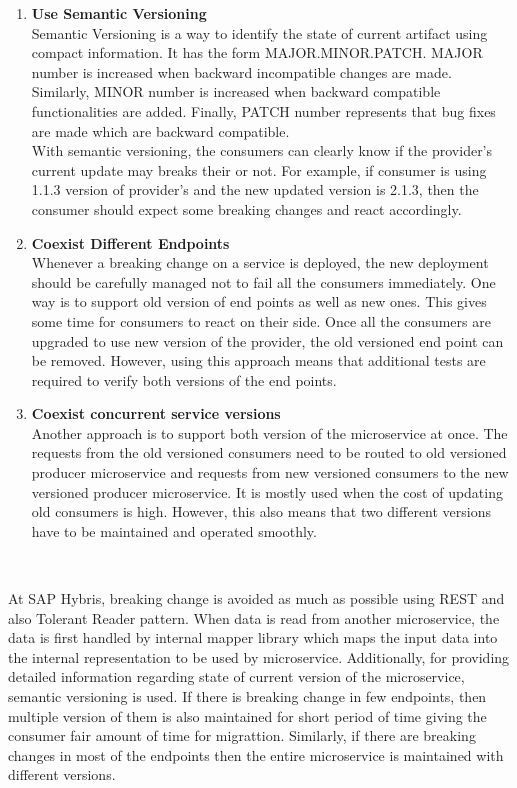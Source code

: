 \begin{enumerate}
\item \textbf{Use Semantic Versioning} \\ Semantic Versioning is a way to identify the state of current artifact using compact information. It has the form MAJOR.MINOR.PATCH. MAJOR number is increased when backward incompatible changes are made. Similarly, MINOR number is increased when backward compatible functionalities are added. Finally, PATCH number represents that bug fixes are made which are backward compatible.\\
With semantic versioning, the consumers can clearly know if the provider's current update may breaks their  or not. For example, if consumer is using 1.1.3 version of provider's  and the new updated version is 2.1.3, then the consumer should expect some breaking changes and react accordingly.
\item \textbf{Coexist Different Endpoints} \\ Whenever a breaking change on a service is deployed, the new deployment should be carefully managed not to fail all the consumers immediately. One way is to support old version of end points as well as new ones. This gives some time for consumers to react on their side. Once all the consumers are upgraded to use new version of the provider, the old versioned end point can be removed. However, using this approach means that additional tests are required to verify both versions of the end points.
\item \textbf{Coexist concurrent service versions} \\ Another approach is to support both version of the microservice at once. The requests from the old versioned consumers need to be routed to old versioned producer microservice and requests from new versioned consumers to the new versioned producer microservice. It is mostly used when the cost of updating old consumers is high. However, this also means that two different versions have to be maintained and operated smoothly.
\end{enumerate}
\\
\begin{shaded}
At SAP Hybris, breaking change is avoided as much as possible using \acrshort{REST} and also Tolerant Reader pattern. When data is read from another microservice, the data is first handled by internal mapper library which maps the input data into the internal representation to be used by microservice. Additionally, for providing detailed information regarding state of current version of the microservice, semantic versioning is used. If there is breaking change in few endpoints, then multiple version of them is also maintained for short period of time giving the consumer fair amount of time for migrattion. Similarly, if there are breaking changes in most of the endpoints then the entire microservice is maintained with different versions.
\end{shaded}
